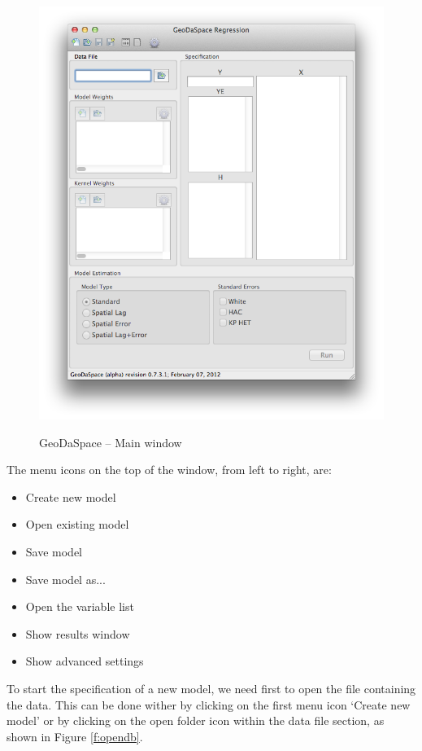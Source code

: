 \documentclass{article}
\begin{document}
\begin{figure}[htb]
\caption{GeoDaSpace -- Main window}
\label{f:gui}
\begin{center}
\includegraphics[width=0.8\linewidth]{GUI.png}\\
\end{center}
\end{figure}

The menu icons on the top of the window, from left to right, are:
\begin{itemize}
\item Create new model
\item Open existing model
\item Save model
\item Save model as...
\item Open the variable list
\item Show results window
\item Show advanced settings
\end{itemize}

To start the specification of a new model, we need first to open the file containing the data. This can be done wither by clicking on the first menu icon `Create new model' or by clicking on the open folder icon within the data file section, as shown in Figure \ref{f:opendb}.
\end{document}
